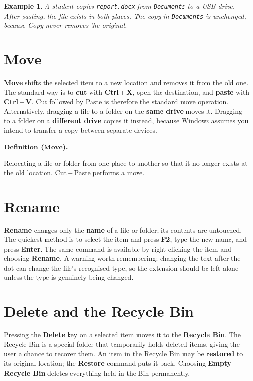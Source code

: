 \documentclass[11pt]{article}
\newtheorem{example}{Example}[section]
\newenvironment{definitionbox}[1]{%
  \par\noindent\textbf{Definition (#1).}\ \itshape
}{\par\vspace{0.3em}}
\begin{document}
\begin{example}
A student copies \texttt{report.docx} from \texttt{Documents} to a USB drive.
After pasting, the file exists in both places. The copy in
\texttt{Documents} is unchanged, because Copy never removes the original.
\end{example}

\section{Move}
\textbf{Move} shifts the selected item to a new location and removes it from
the old one. The standard way is to \textbf{cut} with
\textbf{Ctrl}\,+\,\textbf{X}, open the destination, and \textbf{paste} with
\textbf{Ctrl}\,+\,\textbf{V}. Cut followed by Paste is therefore the standard
move operation. Alternatively, dragging a file to a folder on the
\textbf{same drive} moves it. Dragging to a folder on a \textbf{different
drive} copies it instead, because Windows assumes you intend to transfer a
copy between separate devices.

\begin{definitionbox}{Move}
Relocating a file or folder from one place to another so that it no longer
exists at the old location. Cut\,+\,Paste performs a move.
\end{definitionbox}

\section{Rename}
\textbf{Rename} changes only the \textbf{name} of a file or folder; its
contents are untouched. The quickest method is to select the item and press
\textbf{F2}, type the new name, and press \textbf{Enter}. The same command is
available by right-clicking the item and choosing \textbf{Rename}. A warning
worth remembering: changing the text after the dot can change the file's
recognised type, so the extension should be left alone unless the type is
genuinely being changed.

\section{Delete and the Recycle Bin}
Pressing the \textbf{Delete} key on a selected item moves it to the
\textbf{Recycle Bin}. The Recycle Bin is a special folder that temporarily
holds deleted items, giving the user a chance to recover them. An item in the
Recycle Bin may be \textbf{restored} to its original location; the
\textbf{Restore} command puts it back. Choosing \textbf{Empty Recycle Bin}
deletes everything held in the Bin permanently.
\end{document}
